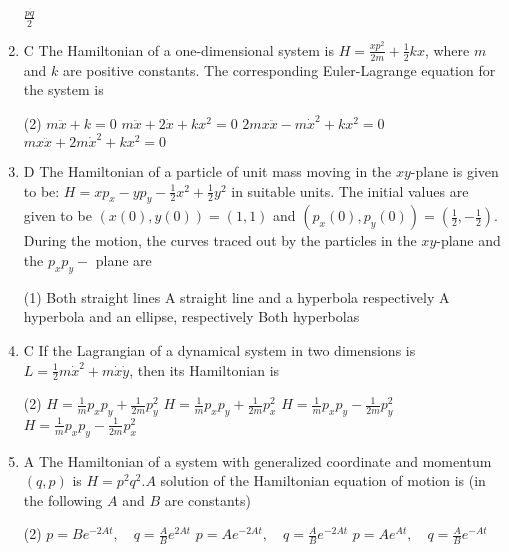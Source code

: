 \begin{enumerate}
\begin{tasks}
		\task[\textbf{d.}] $\frac{p \dot{q}}{2}$
	\end{tasks}
	\item C The Hamiltonian of a one-dimensional system is $H=\frac{x p^{2}}{2 m}+\frac{1}{2} k x$, where $m$ and $k$ are positive constants. The corresponding Euler-Lagrange equation for the system is
	{}
	 \begin{tasks}(2)
		\task[\textbf{a.}] $m \ddot{x}+k=0$
		\task[\textbf{b.}] $m \ddot{x}+2 \dot{x}+k x^{2}=0$
		\task[\textbf{c.}]$2 m x \ddot{x}-m \dot{x}^{2}+k x^{2}=0$
		\task[\textbf{d.}] $m x \ddot{x}+2 m \dot{x}^{2}+k x^{2}=0$
	\end{tasks}
\item D The Hamiltonian of a particle of unit mass moving in the $x y$-plane is given to be: $H=x p_{x}-y p_{y}-\frac{1}{2} x^{2}+\frac{1}{2} y^{2}$ in suitable units. The initial values are given to be $(x(0), y(0))=(1,1)$ and $\left(p_{x}(0), p_{y}(0)\right)=\left(\frac{1}{2},-\frac{1}{2}\right)$. During the motion, the curves traced out by the particles in the $x y$-plane and the $p_{x} p_{y}-$ plane are
{}
 \begin{tasks}(1)
	\task[\textbf{a.}]Both straight lines
	\task[\textbf{b.}]A straight line and a hyperbola respectively
	\task[\textbf{c.}]A hyperbola and an ellipse, respectively
	\task[\textbf{d.}] Both hyperbolas
\end{tasks}
\item C If the Lagrangian of a dynamical system in two dimensions is $L=\frac{1}{2} m \dot{x}^{2}+m \dot{x} \dot{y}$, then its Hamiltonian is
{}
 \begin{tasks}(2)
	\task[\textbf{a.}]$H=\frac{1}{m} p_{x} p_{y}+\frac{1}{2 m} p_{y}^{2}$
	\task[\textbf{b.}] $H=\frac{1}{m} p_{x} p_{y}+\frac{1}{2 m} p_{x}^{2}$
	\task[\textbf{c.}]$H=\frac{1}{m} p_{x} p_{y}-\frac{1}{2 m} p_{y}^{2}$
	\task[\textbf{d.}] $H=\frac{1}{m} p_{x} p_{y}-\frac{1}{2 m} p_{x}^{2}$
\end{tasks}
\item A The Hamiltonian of a system with generalized coordinate and momentum $(q, p)$ is $H=p^{2} q^{2} . A$ solution of the Hamiltonian equation of motion is (in the following $A$ and $B$ are constants)
{}
 \begin{tasks}(2)
	\task[\textbf{a.}] $p=B e^{-2 A t}, \quad q=\frac{A}{B} e^{2 A t}$
	\task[\textbf{b.}] $p=A e^{-2 A t}, \quad q=\frac{A}{B} e^{-2 A t}$
	\task[\textbf{c.}]$p=A e^{A t}, \quad q=\frac{A}{B} e^{-A t}$

\end{tasks}
\end{enumerate}
